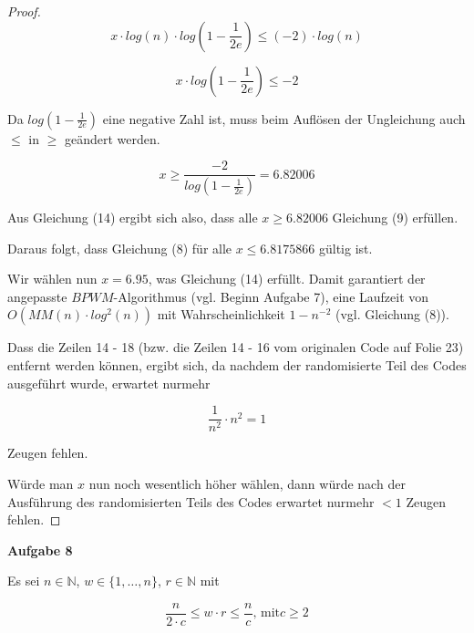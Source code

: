 \documentclass{article}
\begin{document}
\begin{proof}
  \begin{equation}
    x \cdot log \left( n \right) \cdot log \left( 1 - \frac{1}{2e} \right) \leq (-2) \cdot log \left( n \right)
  \end{equation}

  \begin{equation}
    x \cdot log \left( 1 - \frac{1}{2e} \right) \leq -2
  \end{equation}

  Da $log \left( 1 - \frac{1}{2e} \right)$ eine negative Zahl ist, muss beim
  Aufl{\"o}sen der Ungleichung auch $\leq$ in $\geq$ ge{\"a}ndert werden.

  \begin{equation}
    x \geq \frac{-2}{log \left( 1 - \frac{1}{2e} \right)} = 6.82006
  \end{equation}

  Aus Gleichung (14) ergibt sich also, dass alle $x \geq 6.82006$ Gleichung (9)
  erf{\"u}llen. \newline

  Daraus folgt, dass Gleichung (8) f{\"u}r alle $x \leq 6.8175866$ g{\"u}ltig ist.

  Wir w{\"a}hlen nun $x = 6.95$, was Gleichung (14) erf{\"u}llt. \newline
  Damit garantiert der angepasste $BPWM$-Algorithmus (vgl. Beginn Aufgabe 7),
  eine Laufzeit von $O \left( MM \left( n \right) \cdot log^2(n) \right)$ mit
  Wahrscheinlichkeit $1 - n^{-2}$  (vgl. Gleichung (8)).

  Dass die Zeilen 14 - 18 (bzw. die Zeilen 14 - 16 vom originalen Code auf Folie
  23) entfernt werden k{\"o}nnen, ergibt sich, da nachdem der randomisierte
  Teil des Codes ausgef{\"u}hrt wurde, erwartet nurmehr

  \begin{equation}
    \frac{1}{n^2} \cdot n^2 = 1
  \end{equation}

  Zeugen fehlen.

  W{\"u}rde man $x$ nun noch wesentlich h{\"o}her w{\"a}hlen, dann w{\"u}rde
  nach der Ausf{\"u}hrung des randomisierten Teils des Codes erwartet nurmehr
  $< 1$ Zeugen fehlen.
\end{proof}

\newpage
{\noindent\bfseries Aufgabe 8}%
\medskip%

\noindent
Es sei $n \in \mathbb{N}$, $w \in \{ 1, \ldots, n \}$, $r \in \mathbb{N}$ mit

\begin{equation}
  \frac{n}{2 \cdot c} \leq w \cdot r \leq \frac{n}{c}\text{, mit} c \geq 2
\end{equation}
\end{document}
